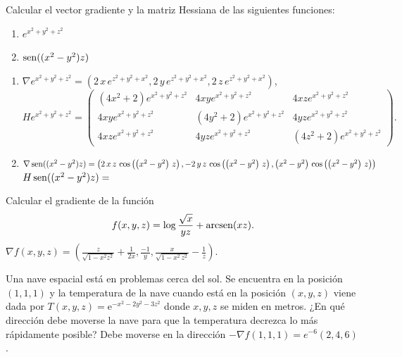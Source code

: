 {Calcular el vector gradiente y la matriz Hessiana de las siguientes funciones:
\begin{multicols}{2}
\begin{enumerate}
\item $e^{x^2+y^2+z^2}$
\item $\operatorname{sen}((x^2-y^2)z)$
\end{enumerate}
\end{multicols}
}
{\begin{enumerate}
\item $\nabla e^{x^2+y^2+z^2} = \left( 2\,x\,e^{z^2+y^2+x^2} , 2\,y\,e^{z^2+y^2+x^2} , 2\,z\,e^{z^2 +y^2+x^2} \right)$,\\
$
H e^{x^2+y^2+z^2} = 
\left(
\begin{array}{ccc}
(4x^2+2)e^{x^2+y^2+z^2} & 4xye^{x^2+y^2+z^2} & 4xze^{x^2+y^2+z^2} \\ 
4xye^{x^2+y^2+z^2} & (4y^2+2)e^{x^2+y^2+z^2} & 4yze^{x^2+y^2+z^2} \\ 
4xze^{x^2+y^2+z^2} & 4yze^{x^2+y^2+z^2} & (4z^2+2)e^{x^2+y^2+z^2}
\end{array} 
\right).
$
\item $\nabla \operatorname{sen}((x^2-y^2)z) = \left( 2\,x\,z\,\cos \left(\left(x^2-y^2\right)\,z\right) , -2\,y\, z\,\cos \left(\left(x^2-y^2\right)\,z\right) , \left(x^2-y^2\right) \,\cos \left(\left(x^2-y^2\right)\,z\right) \right) $\\
$H \operatorname{sen}((x^2-y^2)z) =$\\
\end{enumerate}
}
{
}


{Calcular el gradiente de la función
\[ f(x,y,z)=\log \frac{\sqrt{x}}{yz}+\operatorname{arcsen} (xz). \]
}
{$\nabla f(x,y,z) = \left( \frac{z}{\sqrt{1-x^2z^2}}+\frac{1}{2x} ,\frac{-1}{y} , \frac{x}{\sqrt{1-x^2\,z^2}}-\frac{1}{z} \right) $.
}
{
}


{Una nave espacial está en problemas cerca del sol.
Se encuentra en la posición $(1,1,1)$ y la temperatura de la nave cuando está en la posición $(x,y,z)$ viene dada por
$T(x,y,z)=\mbox{e}^{-x^2-2y^2-3z^2}$ donde $x,y,z$ se miden en metros.
¿En qué dirección debe moverse la nave para que la temperatura decrezca lo más rápidamente posible? }
{Debe moverse en la dirección $-\nabla f(1,1,1)=e^{-6}(2,4,6)$.
}
{
}

